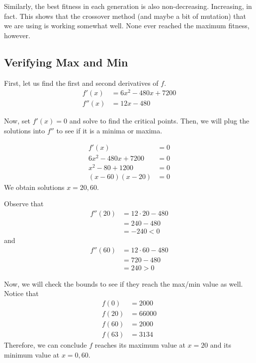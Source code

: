 Similarly, the best fitness in each generation is also non-decreasing. Increasing, in fact. This shows that the crossover method (and maybe a bit of mutation) that we are using is working somewhat well. None ever reached the maximum fitness, however.

\subsection{Verifying Max and Min}

First, let us find the first and second derivatives of \(f\).
\[
\begin{aligned}
    f'(x) &= 6x^2 - 480x + 7200 \\
    f''(x) &= 12x - 480
\end{aligned}
\]

Now, set \(f'(x) = 0\) and solve to find the critical points. Then, we will plug the solutions into \(f''\) to see if it is a minima or maxima.

\[
\begin{aligned}
    f'(x) &= 0 \\
    6x^2 - 480x + 7200 &= 0 \\
    x^2 - 80 + 1200 &= 0 \\
    (x-60)(x-20) &= 0
\end{aligned}
\]
We obtain solutions \(x=20, 60\).

Observe that
\[
\begin{aligned}
    f''(20) &= 12 \cdot 20 - 480 \\
            &= 240 - 480 \\
            &= -240 < 0
\end{aligned}
\]
and
\[
\begin{aligned}
    f''(60) &= 12 \cdot 60 - 480 \\
            &= 720 - 480 \\
            &= 240 > 0
\end{aligned}
\]

Now, we will check the bounds to see if they reach the max/min value as well. Notice that
\[
\begin{aligned}
    f(0) &= 2000 \\
    f(20) &= 66000 \\
    f(60) &= 2000 \\
    f(63) &= 3134
\end{aligned}
\]
Therefore, we can conclude \(f\) reaches its maximum value at \(x=20\) and its minimum value at \(x=0, 60\).

